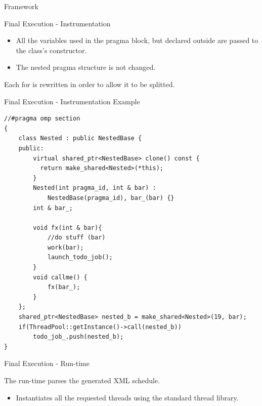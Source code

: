 \documentclass[xcolor=dvipsnames]{beamer}
\begin{document}
\begin{section}{Framework}
\begin{frame}{\hskip 0.3cm Final Execution - Instrumentation}
\begin{itemize}
\item All the variables used in the pragma block, but declared outside are passed to the class's constructor.

\item The nested pragma structure is not changed.

\end{itemize}

Each for is rewritten in order to allow it to be splitted.



\end{frame}













\begin{frame}[fragile]{\hskip 0.3cm Final Execution - Instrumentation Example}

\begin{lstlisting}[language=CCC]
 //#pragma omp section
{
    class Nested : public NestedBase {
    public: 
        virtual shared_ptr<NestedBase> clone() const { 
          return make_shared<Nested>(*this); 
        } 
        Nested(int pragma_id, int & bar) : 
            NestedBase(pragma_id), bar_(bar) {}
        int & bar_;
            
        void fx(int & bar){   
            //do stuff (bar)
            work(bar);
            launch_todo_job(); 
        }
        void callme() {
            fx(bar_);
        }
    };
    shared_ptr<NestedBase> nested_b = make_shared<Nested>(19, bar);                             
    if(ThreadPool::getInstance()->call(nested_b)) 
        todo_job_.push(nested_b); 
}
\end{lstlisting}


\end{frame}








\begin{frame}{\hskip 0.3cm Final Execution - Run-time }

The run-time parses the generated XML schedule. 

\begin{itemize}

\item Instantiates all the requested threads using the standard thread library.


\end{itemize}
\end{frame}
\end{section}
\end{document}
